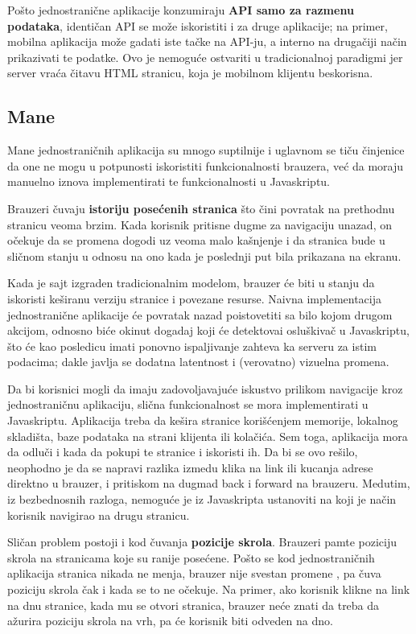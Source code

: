 Pošto jednostranične aplikacije konzumiraju \textbf{API samo za razmenu podataka}, identičan API se može iskoristiti i za druge aplikacije; na primer, mobilna aplikacija može gadati iste tačke na API-ju, a interno na drugačiji način prikazivati te podatke.
Ovo je nemoguće ostvariti u tradicionalnoj paradigmi jer server vraća čitavu HTML stranicu, koja je mobilnom klijentu beskorisna.

\subsection{Mane}

Mane jednostraničnih aplikacija su mnogo suptilnije i uglavnom se tiču činjenice da one ne mogu u potpunosti iskoristiti funkcionalnosti brauzera, već da moraju manuelno iznova implementirati te funkcionalnosti u Javaskriptu.

Brauzeri čuvaju \textbf{istoriju posećenih stranica} što čini povratak na prethodnu stranicu veoma brzim.
Kada korisnik pritisne dugme za navigaciju unazad, on očekuje da se promena dogodi uz veoma malo kašnjenje i da stranica bude u sličnom stanju u odnosu na ono kada je poslednji put bila prikazana na ekranu.

Kada je sajt izgraden tradicionalnim modelom, brauzer će biti u stanju da iskoristi keširanu verziju stranice i povezane resurse.
Naivna implementacija jednostranične aplikacije će povratak nazad poistovetiti sa bilo kojom drugom akcijom, odnosno biće okinut dogadaj koji će detektovai osluškivač u Javaskriptu, što će kao posledicu imati ponovno ispaljivanje zahteva ka serveru za istim podacima; dakle javlja se dodatna latentnost i (verovatno) vizuelna promena.

Da bi korisnici mogli da imaju zadovoljavajuće iskustvo prilikom navigacije kroz jednostraničnu aplikaciju, slična funkcionalnost se mora implementirati u Javaskriptu. Aplikacija treba da kešira stranice korišćenjem memorije, lokalnog skladišta, baze podataka na strani klijenta ili kolačića.
Sem toga, aplikacija mora da odluči i kada da pokupi te stranice i iskoristi ih.
Da bi se ovo rešilo, neophodno je da se napravi razlika izmedu klika na link ili kucanja adrese direktno u brauzer, i pritiskom na dugmad back i forward na brauzeru. 
Medutim, iz bezbednosnih razloga, nemoguće je iz Javaskripta ustanoviti na koji je način korisnik navigirao na drugu stranicu.

Sličan problem postoji i kod čuvanja \textbf{pozicije skrola}.
Brauzeri pamte poziciju skrola na stranicama koje su ranije posećene.
Pošto se kod jednostraničnih aplikacija stranica nikada ne menja, brauzer nije svestan promene , pa čuva poziciju skrola čak i kada se to ne očekuje.
Na primer, ako korisnik klikne na link na dnu stranice, kada mu se otvori  stranica, brauzer neće znati da treba da ažurira poziciju skrola na vrh, pa će korisnik biti odveden na dno.

